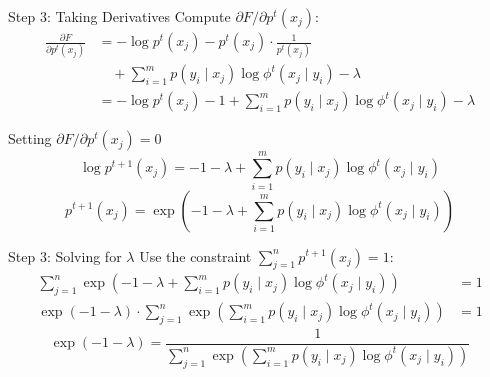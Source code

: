 \documentclass{beamer}
\begin{document}
\begin{frame}{Step 3: Taking Derivatives}
    Compute $\partial F / \partial p^t(x_j)$:
    \begin{align*}
        \frac{\partial F}{\partial p^t(x_j)} &= -\log p^t(x_j) - p^t(x_j) \cdot \frac{1}{p^t(x_j)} \\
        &\quad + \sum_{i=1}^{m} p(y_i \mid x_j) \log \phi^t(x_j \mid y_i) - \lambda \\
        &= -\log p^t(x_j) - 1 + \sum_{i=1}^{m} p(y_i \mid x_j) \log \phi^t(x_j \mid y_i) - \lambda
    \end{align*}

    \begin{exampleblock}{Setting $\partial F / \partial p^t(x_j) = 0$}
        $$
            \log p^{t+1}(x_j) = -1 - \lambda + \sum_{i=1}^{m} p(y_i \mid x_j) \log \phi^t(x_j \mid y_i)
        $$
        $$
            p^{t+1}(x_j) = \exp\!\left( -1 - \lambda + \sum_{i=1}^{m} p(y_i \mid x_j) \log \phi^t(x_j \mid y_i) \right)
        $$
    \end{exampleblock}
\end{frame}

\begin{frame}{Step 3: Solving for $\lambda$}
    Use the constraint $\sum_{j=1}^{n} p^{t+1}(x_j) = 1$:
    \begin{align*}
        \sum_{j=1}^{n} \exp\!\left( -1 - \lambda + \sum_{i=1}^{m} p(y_i \mid x_j) \log \phi^t(x_j \mid y_i) \right) &= 1 \\
        \exp(-1 - \lambda) \cdot \sum_{j=1}^{n} \exp\!\left( \sum_{i=1}^{m} p(y_i \mid x_j) \log \phi^t(x_j \mid y_i) \right) &= 1
    \end{align*}
    $$
        \exp(-1 - \lambda) = \frac{1}{\sum_{j=1}^{n} \exp\!\left( \sum_{i=1}^{m} p(y_i \mid x_j) \log \phi^t(x_j \mid y_i) \right)}
    $$
\end{frame}
\end{document}
